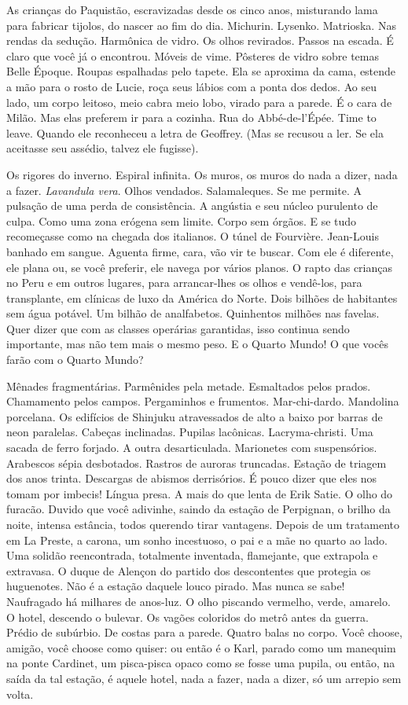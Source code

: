 As crianças do Paquistão, escravizadas desde os cinco anos, misturando
lama para fabricar tijolos, do nascer ao fim do dia. Michurin. Lysenko.
Matrioska. Nas rendas da sedução. Harmônica de vidro. Os olhos
revirados. Passos na escada. É claro que você já o encontrou. Móveis de
vime. Pôsteres de vidro sobre temas Belle Époque. Roupas espalhadas pelo
tapete. Ela se aproxima da cama, estende a mão para o rosto de Lucie,
roça seus lábios com a ponta dos dedos. Ao seu lado, um corpo leitoso,
meio cabra meio lobo, virado para a parede. É o cara de Milão. Mas elas
preferem ir para a cozinha. Rua do Abbé-de-l'Épée. Time to leave. Quando
ele reconheceu a letra de Geoffrey. (Mas se recusou a ler. Se ela
aceitasse seu assédio, talvez ele fugisse).

Os rigores do inverno. Espiral infinita. Os muros, os muros do nada a
dizer, nada a fazer. \emph{Lavandula vera}. Olhos vendados.
Salamaleques. Se me permite. A pulsação de uma perda de consistência. A
angústia e seu núcleo purulento de culpa. Como uma zona erógena sem
limite. Corpo sem órgãos. E se tudo recomeçasse como na chegada dos
italianos. O túnel de Fourvière. Jean-Louis banhado em sangue. Aguenta
firme, cara, vão vir te buscar. Com ele é diferente, ele plana ou, se
você preferir, ele navega por vários planos. O rapto das crianças no
Peru e em outros lugares, para arrancar-lhes os olhos e vendê-los, para
transplante, em clínicas de luxo da América do Norte. Dois bilhões de
habitantes sem água potável. Um bilhão de analfabetos. Quinhentos
milhões nas favelas. Quer dizer que com as classes operárias garantidas,
isso continua sendo importante, mas não tem mais o mesmo peso. E o
Quarto Mundo! O que vocês farão com o Quarto Mundo?

Mênades fragmentárias. Parmênides pela metade. Esmaltados pelos prados.
Chamamento pelos campos. Pergaminhos e frumentos. Mar-chi-dardo.
Mandolina porcelana. Os edifícios de Shinjuku atravessados de alto a
baixo por barras de neon paralelas. Cabeças inclinadas. Pupilas
lacônicas. Lacryma-christi. Uma sacada de ferro forjado. A outra
desarticulada. Marionetes com suspensórios. Arabescos sépia desbotados.
Rastros de auroras truncadas. Estação de triagem dos anos trinta.
Descargas de abismos derrisórios. É pouco dizer que eles nos tomam por
imbecis! Língua presa. A mais do que lenta de Erik Satie. O olho do
furacão. Duvido que você adivinhe, saindo da estação de Perpignan, o
brilho da noite, intensa estância, todos querendo tirar vantagens.
Depois de um tratamento em La Preste, a carona, um sonho incestuoso, o
pai e a mãe no quarto ao lado. Uma solidão reencontrada, totalmente
inventada, flamejante, que extrapola e extravasa. O duque de Alençon do
partido dos descontentes que protegia os huguenotes. Não é a estação
daquele louco pirado. Mas nunca se sabe! Naufragado há milhares de
anos-luz. O olho piscando vermelho, verde, amarelo. O hotel, descendo o
bulevar. Os vagões coloridos do metrô antes da guerra. Prédio de
subúrbio. De costas para a parede. Quatro balas no corpo. Você choose,
amigão, você choose como quiser: ou então é o Karl, parado como um
manequim na ponte Cardinet, um pisca-pisca opaco como se fosse uma
pupila, ou então, na saída da tal estação, é aquele hotel, nada a fazer,
nada a dizer, só um arrepio sem volta.

